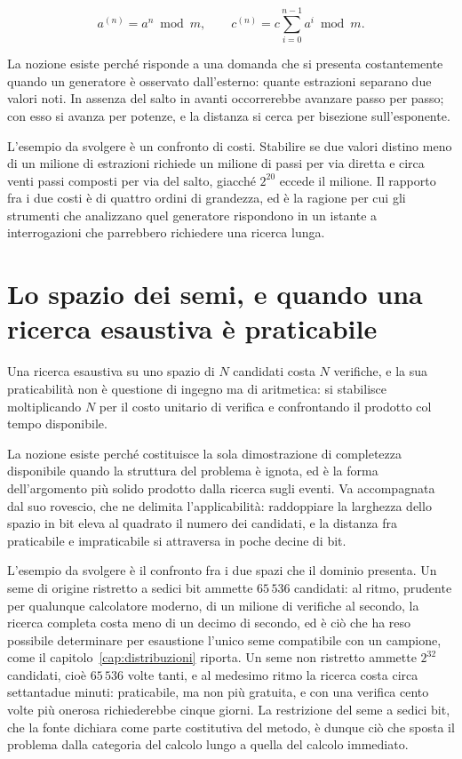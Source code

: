 \begin{equation}
a^{(n)} = a^n \bmod m, \qquad c^{(n)} = c \sum_{i=0}^{n-1} a^i \bmod m .
\end{equation}

La nozione esiste perché risponde a una domanda che si presenta costantemente quando un generatore è osservato dall'esterno: quante estrazioni separano due valori noti. In assenza del salto in avanti occorrerebbe avanzare passo per passo; con esso si avanza per potenze, e la distanza si cerca per bisezione sull'esponente.

L'esempio da svolgere è un confronto di costi. Stabilire se due valori distino meno di un milione di estrazioni richiede un milione di passi per via diretta e circa venti passi composti per via del salto, giacché $2^{20}$ eccede il milione. Il rapporto fra i due costi è di quattro ordini di grandezza, ed è la ragione per cui gli strumenti che analizzano quel generatore rispondono in un istante a interrogazioni che parrebbero richiedere una ricerca lunga.

\section{Lo spazio dei semi, e quando una ricerca esaustiva è praticabile}

Una ricerca esaustiva su uno spazio di $N$ candidati costa $N$ verifiche, e la sua praticabilità non è questione di ingegno ma di aritmetica: si stabilisce moltiplicando $N$ per il costo unitario di verifica e confrontando il prodotto col tempo disponibile.

La nozione esiste perché costituisce la sola dimostrazione di completezza disponibile quando la struttura del problema è ignota, ed è la forma dell'argomento più solido prodotto dalla ricerca sugli eventi. Va accompagnata dal suo rovescio, che ne delimita l'applicabilità: raddoppiare la larghezza dello spazio in bit eleva al quadrato il numero dei candidati, e la distanza fra praticabile e impraticabile si attraversa in poche decine di bit.

L'esempio da svolgere è il confronto fra i due spazi che il dominio presenta. Un seme di origine ristretto a sedici bit ammette $65\,536$ candidati: al ritmo, prudente per qualunque calcolatore moderno, di un milione di verifiche al secondo, la ricerca completa costa meno di un decimo di secondo, ed è ciò che ha reso possibile determinare per esaustione l'unico seme compatibile con un campione, come il capitolo~\ref{cap:distribuzioni} riporta. Un seme non ristretto ammette $2^{32}$ candidati, cioè $65\,536$ volte tanti, e al medesimo ritmo la ricerca costa circa settantadue minuti: praticabile, ma non più gratuita, e con una verifica cento volte più onerosa richiederebbe cinque giorni. La restrizione del seme a sedici bit, che la fonte dichiara come parte costitutiva del metodo, è dunque ciò che sposta il problema dalla categoria del calcolo lungo a quella del calcolo immediato.

